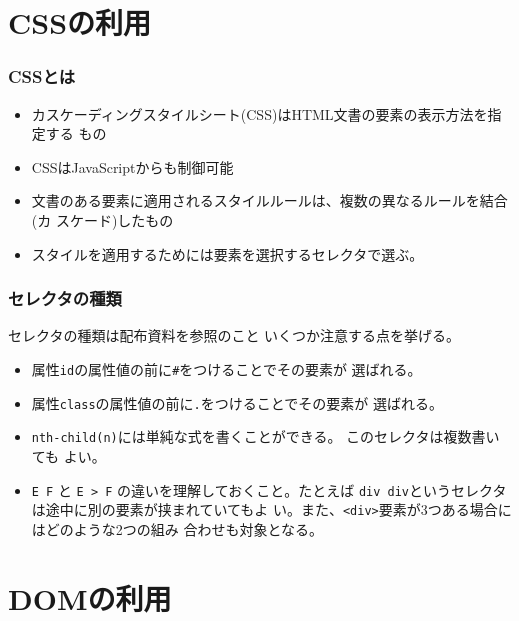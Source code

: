 \section{CSSの利用}
\begin{frame}[containsverbatim]
 \frametitle{CSSとは}
\begin{itemize}
 \item カスケーディングスタイルシート(CSS)はHTML文書の要素の表示方法を指定する
もの
 \item CSSはJavaScriptからも制御可能
 \item 文書のある要素に適用されるスタイルルールは、複数の異なるルールを結合(カ
スケード)したもの
 \item スタイルを適用するためには要素を選択するセレクタで選ぶ。
\end{itemize}
\end{frame}
\begin{frame}[containsverbatim]
 \frametitle{セレクタの種類}
セレクタの種類は配布資料を参照のこと
いくつか注意する点を挙げる。
\begin{itemize}
 \item 属性\texttt{id}の属性値の前に\texttt{\#}をつけることでその要素が
       選ばれる。
 \item 属性\texttt{class}の属性値の前に\texttt{.}をつけることでその要素が
       選ばれる。
 \item \texttt{nth-child(n)}には単純な式を書くことができる。
このセレクタは複数書いても
       よい。
 \item \Verb+E F+ と \Verb+E > F+ の違いを理解しておくこと。たとえば
       \texttt{div div}というセレクタは途中に別の要素が挟まれていてもよ
       い。また、\texttt{<div>}要素が3つある場合にはどのような2つの組み
       合わせも対象となる。
\end{itemize}
\end{frame}
\section{DOMの利用}
